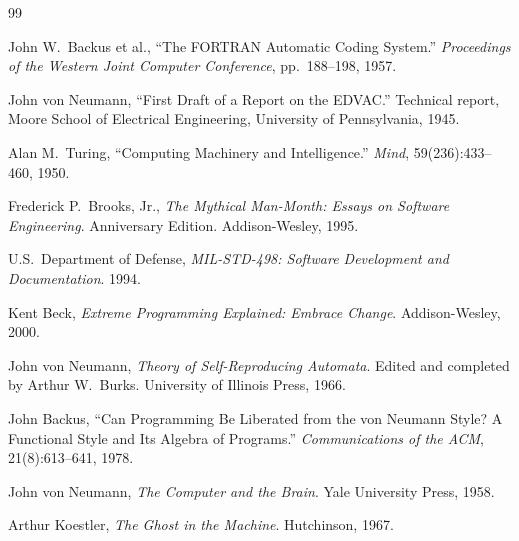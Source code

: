 \documentclass[12pt]{extarticle}
\begin{document}
\begingroup
\setlength{\parskip}{0pt}
\begin{thebibliography}{99}

John W.\ Backus et al., ``The FORTRAN Automatic Coding System.''
\emph{Proceedings of the Western Joint Computer Conference}, pp.\ 188--198, 1957.

John von Neumann, ``First Draft of a Report on the EDVAC.'' Technical report, Moore School of Electrical Engineering, University of Pennsylvania, 1945.

Alan M.\ Turing, ``Computing Machinery and Intelligence.''
\emph{Mind}, 59(236):433--460, 1950.

Frederick P.\ Brooks, Jr., \emph{The Mythical Man-Month: Essays on Software Engineering}. Anniversary Edition. Addison-Wesley, 1995.

U.S.\ Department of Defense, \emph{MIL-STD-498: Software Development and Documentation}. 1994.

Kent Beck, \emph{Extreme Programming Explained: Embrace Change}. Addison-Wesley, 2000.

John von Neumann, \emph{Theory of Self-Reproducing Automata}. Edited and completed by Arthur W.\ Burks. University of Illinois Press, 1966.

John Backus, ``Can Programming Be Liberated from the von Neumann Style? A Functional Style and Its Algebra of Programs.''
\emph{Communications of the ACM}, 21(8):613--641, 1978.

John von Neumann, \emph{The Computer and the Brain}. Yale University Press, 1958.

Arthur Koestler, \emph{The Ghost in the Machine}. Hutchinson, 1967.

\end{thebibliography}
\endgroup
\end{document}
